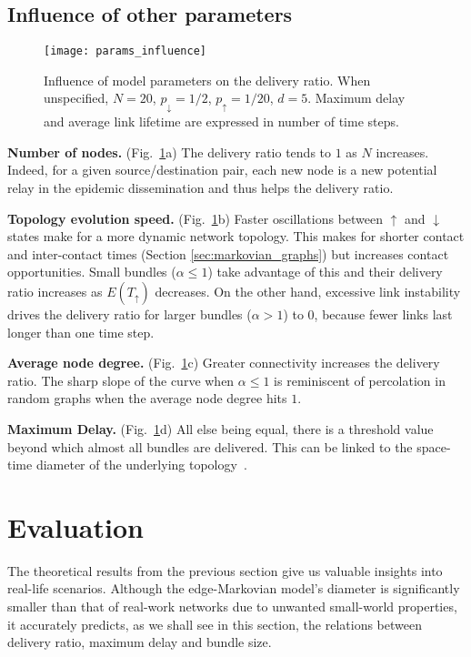 \documentclass[final,journal,letterpaper]{IEEEtran}
\begin{document}
\subsection{Influence of other parameters}
\label{subsec:params}

\begin{figure}[t]
  \centering
  \texttt{[image: params\_influence]}
  \caption{Influence of model parameters on the delivery ratio. When unspecified, $N=20$, $p_\downarrow=1/2$, $p_\uparrow=1/20$, $d=5$. Maximum delay and average link lifetime are expressed in number of time steps.}
  \label{params_influence}
\end{figure}

\noindent\textbf{Number of nodes.}
(Fig.~\ref{params_influence}a) The delivery ratio tends to $1$ as $N$ increases. Indeed, for a given source/destination pair, each new node is a new potential relay in the epidemic dissemination and thus helps the delivery ratio.

\noindent\textbf{Topology evolution speed.}
(Fig.~\ref{params_influence}b) Faster oscillations between $\uparrow$ and $\downarrow$ states make for a more dynamic network topology. This makes for shorter contact and inter-contact times (Section \ref{sec:markovian_graphs}) but increases contact opportunities. Small bundles ($\alpha \le 1$) take advantage of this and their delivery ratio increases as $E(T_\uparrow)$ decreases. On the other hand, excessive link instability drives the delivery ratio for larger bundles ($\alpha > 1$) to 0, because fewer links last longer than one time step.

\noindent\textbf{Average node degree.}
(Fig.~\ref{params_influence}c) Greater connectivity increases the delivery ratio. The sharp slope of the curve when $\alpha \le 1$ is reminiscent of percolation in random graphs when the average node degree hits $1$.

\noindent\textbf{Maximum Delay.}
(Fig.~\ref{params_influence}d) All else being equal, there is a threshold value beyond which almost all bundles are delivered. This can be linked to the space-time diameter of the underlying topology~\cite{chaintreau_diam}.


\section{Evaluation}
\label{sec:experimental}

The theoretical results from the previous section give us valuable insights into real-life scenarios. Although the edge-Markovian model's diameter is significantly smaller than that of real-work networks due to unwanted small-world properties, it accurately predicts, as we shall see in this section, the relations between delivery ratio, maximum delay and bundle size.
\end{document}
